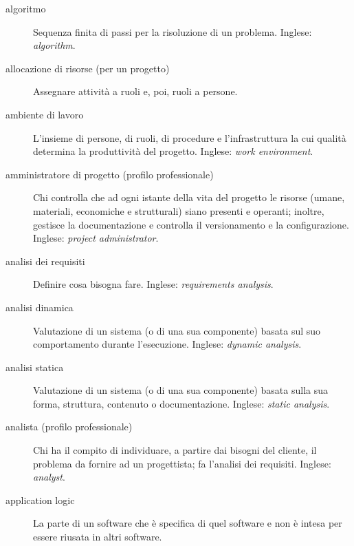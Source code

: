 \documentclass[a4paper]{article}
\begin{document}
		
	\begin{description}
		
			
	\item[algoritmo] 

			Sequenza finita di passi per la risoluzione di un problema. Inglese: \emph{algorithm}.
			
	\item[allocazione di risorse (per un progetto)] 

			Assegnare attività a ruoli e, poi, ruoli a persone.
			
	\item[ambiente di lavoro] 

			L'insieme di persone, di ruoli, di procedure e l'infrastruttura la cui qualità determina la produttività del progetto. Inglese: \emph{work environment}.
			
	\item[amministratore di progetto (profilo professionale)] 

			Chi controlla che ad ogni istante della vita del progetto le risorse (umane, materiali, economiche e strutturali) siano presenti e operanti; inoltre, gestisce la documentazione e controlla il versionamento e la configurazione. Inglese: \emph{project administrator}.
			
	\item[analisi dei requisiti] 

			Definire cosa bisogna fare. Inglese: \emph{requirements analysis}.
			
	\item[analisi dinamica] 

			Valutazione di un sistema (o di una sua componente) basata sul suo comportamento durante l'esecuzione. Inglese: \emph{dynamic analysis}.
			
	\item[analisi statica] 

			Valutazione di un sistema (o di una sua componente) basata sulla sua forma, struttura, contenuto o documentazione. Inglese: \emph{static analysis}.
			
	\item[analista (profilo professionale)] 

			Chi ha il compito di individuare, a partire dai bisogni del cliente, il problema da fornire ad un progettista; fa l'analisi dei requisiti. Inglese: \emph{analyst}.
			
	\item[application logic] 

			La parte di un software che è specifica di quel software e non è intesa per essere riusata in altri software.
			

\end{description}
\end{document}
